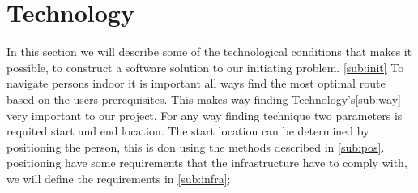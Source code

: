 
\section{Technology}

In this section we will describe some of the technological conditions that makes it possible, to construct a software solution to our initiating problem. \cref{sub:init} 
To navigate persons indoor it is important all ways find the most optimal route based on the users prerequisites. This makes way-finding Technology's\cref{sub:way} very important to our project. For any way finding technique two parameters is requited start and end location. The start location can be determined by positioning the person, this is don using the methods described in \cref{sub:pos}.
positioning have some requirements that the infrastructure have to comply with, we will define the requirements in \cref{sub:infra}; 



 


